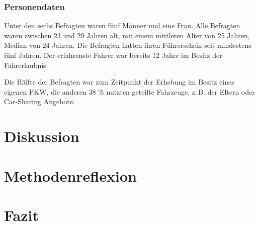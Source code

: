 \documentclass[fontsize=13pt,a4paper]{article}
\begin{document}
\subsubsection*{Personendaten}
Unter den sechs Befragten waren fünf Männer und eine Frau. Alle Befragten waren zwischen 23 und 29 Jahren alt, mit einem mittleren Alter von 25 Jahren, Median von 24 Jahren. Die Befragten hatten ihren Führerschein seit mindestens fünf Jahren. Der erfahrenste Fahrer war bereits 12 Jahre im Besitz der Fahrerlaubnis.

Die Hälfte der Befragten war zum Zeitpunkt der Erhebung im Besitz eines eigenen PKW, die anderen 38 \% nutzten geteilte Fahrzeuge, z.\,B. der Eltern oder Car-Sharing Angebote. 


\section{Diskussion}

\section{Methodenreflexion}

\section{Fazit}
\end{document}
